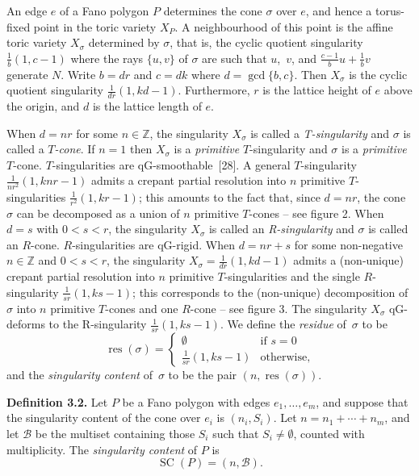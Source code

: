 An edge $e$ of a Fano polygon $P$ determines the cone $\sigma$ over $e$, and hence a torus-fixed point in the toric variety $X_P$. A neighbourhood of this point is the affine toric variety $X_\sigma$ determined by $\sigma$, that is, the cyclic quotient singularity $\frac{1}{b}(1,c-1)$ where the rays $\{u,v\}$ of $\sigma$ are such that $u$,~$v$, and $\frac{c-1}{b} u + \frac{1}{b}v$ generate $N$. Write $b = dr$ and $c = dk$ where $d = \gcd\{b,c\}$. Then $X_\sigma$ is the cyclic quotient singularity $\frac{1}{dr}(1,kd-1)$. Furthermore, $r$ is the lattice height of $e$ above the origin, and $d$ is the lattice length of $e$.

When $d=nr$ for some $n\in\mathbb{Z}$, the singularity $X_\sigma$ is called a \emph{T-singularity} and $\sigma$ is called a \emph{$T$-cone}. If $n=1$ then $X_\sigma$ is a \emph{primitive} $T$-singularity and $\sigma$ is a \emph{primitive} $T$-cone. $T$-singularities are qG-smoothable~\textup{[28]}. A general $T$-singularity $\frac{1}{n r^2}(1, knr-1)$ admits a crepant partial resolution into $n$ primitive $T$-singularities $\frac{1}{r^2}(1, kr-1)$; this amounts to the fact that, since $d = n r$, the cone $\sigma$ can be decomposed as a union of $n$ primitive $T$-cones -- see figure 2.
When $d = s$ with $0 < s < r$, the singularity $X_\sigma$ is called an \emph{R-singularity} and $\sigma$ is called an $R$-cone. $R$-singularities are qG-rigid. When $d = nr+s$ for some non-negative $n \in \mathbb{Z}$ and $0 < s < r$, the singularity $X_\sigma = \frac{1}{dr}(1, kd-1)$ admits a (non-unique) crepant partial resolution into $n$ primitive $T$-singularities and the single $R$-singularity $\frac{1}{sr}(1,ks-1)$; this corresponds to the (non-unique) decomposition of $\sigma$ into $n$ primitive $T$-cones and one $R$-cone -- see figure 3.
\noindent The singularity $X_\sigma$ qG-deforms to the R-singularity $\frac{1}{sr}(1,ks-1)$. We define the \emph{residue} of~$\sigma$ to be
\[
\operatorname{res}(\sigma)=\begin{cases}
\emptyset&\text{if $s=0$}\\
\frac{1}{sr}(1,ks-1)&\text{otherwise,}
\end{cases}
\]
and the \emph{singularity content} of~$\sigma$ to be the pair $(n,\operatorname{res}(\sigma))$.


\par\noindent\textbf{Definition 3.2.} 
Let $P$ be a Fano polygon with edges $e_1,\ldots,e_m$, and suppose that the singularity content of the cone over $e_i$ is $(n_i, S_i)$. Let $n = n_1 + \cdots + n_m$, and let $\mathcal{B}$ be the multiset containing those $S_i$ such that $S_i \ne \emptyset$, counted with multiplicity. The \emph{singularity content} of $P$ is
\[
\operatorname{SC}(P)=(n, \mathcal{B}).
\]

\par
